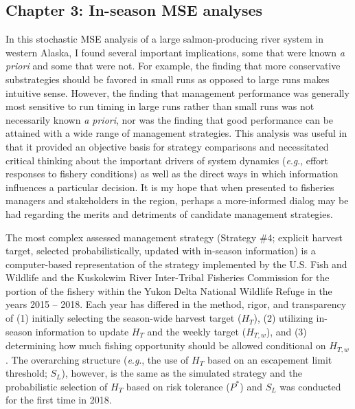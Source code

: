\documentclass[12pt,]{book}
\theoremstyle{definition}
\theoremstyle{definition}
\theoremstyle{definition}
\theoremstyle{remark}
\begin{document}
\subsection{Chapter 3: In-season MSE
analyses}\label{chapter-3-in-season-mse-analyses}

\noindent
In this stochastic MSE analysis of a large salmon-producing river system
in western Alaska, I found several important implications, some that
were known \emph{a priori} and some that were not. For example, the
finding that more conservative substrategies should be favored in small
runs as opposed to large runs makes intuitive sense. However, the
finding that management performance was generally most sensitive to run
timing in large runs rather than small runs was not necessarily known
\emph{a priori}, nor was the finding that good performance can be
attained with a wide range of management strategies. This analysis was
useful in that it provided an objective basis for strategy comparisons
and necessitated critical thinking about the important drivers of system
dynamics (\emph{e}.\emph{g}., effort responses to fishery conditions) as
well as the direct ways in which information influences a particular
decision. It is my hope that when presented to fisheries managers and
stakeholders in the region, perhaps a more-informed dialog may be had
regarding the merits and detriments of candidate management strategies.

The most complex assessed management strategy (Strategy \#4; explicit
harvest target, selected probabilistically, updated with in-season
information) is a computer-based representation of the strategy
implemented by the U.S. Fish and Wildlife and the Kuskokwim River
Inter-Tribal Fisheries Commission for the portion of the fishery within
the Yukon Delta National Wildlife Refuge in the years 2015 -- 2018. Each
year has differed in the method, rigor, and transparency of (1)
initially selecting the season-wide harvest target (\(H_T\)), (2)
utilizing in-season information to update \(H_T\) and the weekly target
(\(H_{T,w}\)), and (3) determining how much fishing opportunity should
be allowed conditional on \(H_{T,w}\). The overarching structure
(\emph{e}.\emph{g}., the use of \(H_T\) based on an escapement limit
threshold; \(S_L\)), however, is the same as the simulated strategy and
the probabilistic selection of \(H_T\) based on risk tolerance (\(P^*\))
and \(S_L\) was conducted for the first time in 2018.
\end{document}
